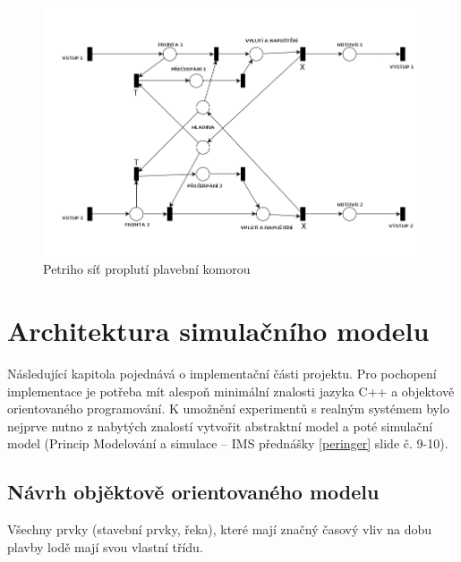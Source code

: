 \documentclass[11pt,a4paper]{article}
\begin{document}
      \begin{figure}[H]
        \centering
        \includegraphics[width=1\textwidth, natwidth=940, natheight=325]
                        {petri_net_2.png}
        \caption{Petriho síť proplutí plavební komorou \label{petri_2}}
      \end{figure}

  \section{Architektura simulačního modelu}

    Následující kapitola pojednává o implementační části projektu. Pro pochopení
    implementace je potřeba mít alespoň minimální znalosti jazyka C++ a 
    objektově orientovaného programování.
    K umožnění experimentů s realným systémem bylo nejprve nutno z nabytých znalostí
    vytvořit abstraktní model a poté simulační model (Princip Modelování a 
    simulace -- IMS přednášky \ref{peringer} slide č. 9-10).

    \subsection{Návrh objěktově orientovaného modelu}
    
      Všechny prvky (stavební prvky, řeka), které mají značný časový vliv na
      dobu plavby lodě mají svou vlastní třídu.
\end{document}
